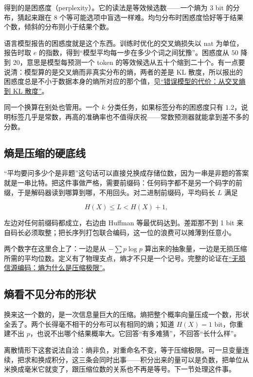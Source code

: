 得到的是困惑度（perplexity）。它的读法是等效候选数——一个熵为 \(3\) bit 的分布，猜起来跟在 8 个等可能选项中盲选一样难。均匀分布时困惑度恰好等于结果个数，倾斜的分布则小于结果个数。

语言模型报告的困惑度就是这个东西。训练时优化的交叉熵损失以 nat 为单位，报告时取 \(e\) 的指数，得到``模型平均每一步在多少个词之间犹豫''。困惑度从 \(50\) 降到 \(20\)，意思是模型每预测一个 token 的等效候选从五十个缩到二十个。有一点要说清：模型算的是交叉熵而非真实分布的熵，两者的差是 KL 散度，所以报出的困惑度总是不小于数据本身的熵所对应的那个值，见\hyperref[sec:07-Information-Theory/03-Divergences/01]{``错误模型的代价：从交叉熵到 KL 散度''}。

同一个换算在别处也管用。一个 \(k\) 分类任务，如果标签分布的困惑度只有 \(1.2\)，说明标签几乎是常数，再高的准确率也不值得庆祝——常数预测器就能拿到差不多的分数。

\subsection{熵是压缩的硬底线}

``平均要问多少个是非题''这句话可以直接兑换成存储位数，因为一串是非题的答案就是一串比特。把这件事做严格，需要前缀码：任何码字都不是另一个码字的前缀，于是解码器读到哪算到哪，不用回头。对二进制前缀码，平均码长 \(L\) 满足

\[
H(X)\le L<H(X)+1,
\]

左边对任何前缀码都成立，右边由 Huffman 等最优码达到。差距那不到 1 bit 来自码长必须取整；把长序列打包联合编码，这一位的浪费可以摊薄到任意小。

两个数字在这里合上了：一边是从 \(-\sum p\log p\) 算出来的抽象量，一边是无损压缩所需的平均位数。定义有了物理支点，熵才不只是一个记号。完整的论证在\hyperref[ch:057]{``无损信源编码：熵为什么是压缩极限''}。

\subsection{熵看不见分布的形状}

换来这一个数的，是一次信息量巨大的压缩。熵把整个概率向量压成一个数，形状全丢了。两个长得毫不相干的分布可以有相同的熵；知道 \(H(X)=1\) bit，你重建不出 \(p\)，也说不出哪个结果概率大。它回答``有多难猜''，不回答``长什么样''。

离散情形下这套说法自洽：熵非负，对重命名不变，等于压缩极限。可一旦变量连续，把求和换成积分，这三条会同时出事——积分出来的量可以是负数，把单位从米换成毫米它就变了，跟压缩位数的关系也不再是等号。下一节处理这件事。
